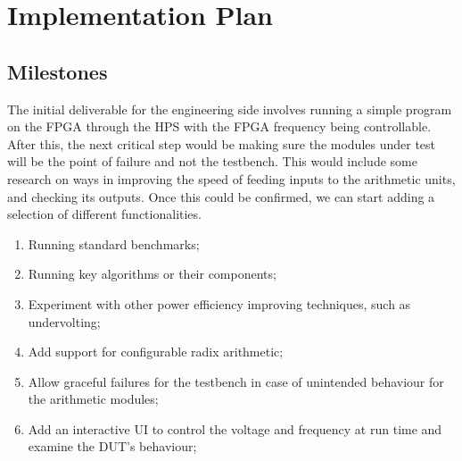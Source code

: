\section{Implementation Plan}


\subsection{Milestones}
The initial deliverable for the engineering side involves running a simple
program on the FPGA through the HPS with the FPGA frequency being controllable.
After this, the next critical step would be making sure the modules under test
will be the point of failure and not the testbench.
This would include some research on ways in improving the speed of feeding
inputs to the arithmetic units, and checking its outputs.
Once this could be confirmed, we can start adding a selection of different functionalities.

\begin{enumerate}
  \item Running standard benchmarks;
  \item Running key algorithms or their components;
  \item Experiment with other power efficiency improving techniques,
        such as undervolting;
  \item Add support for configurable radix arithmetic;
  \item Allow graceful failures for the testbench in case of unintended
        behaviour for the arithmetic modules;
  \item Add an interactive UI to control the voltage and frequency at run time
        and examine the DUT’s behaviour;
\end{enumerate}

